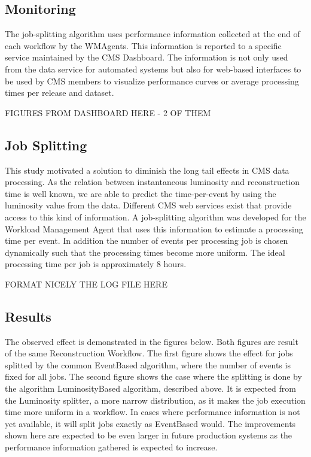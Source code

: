 \documentclass[a4paper]{jpconf}
\begin{document}
\subsection{Monitoring}

The job-splitting algorithm uses performance information collected at the 
end of each workflow by the WMAgents. This information is reported to a 
specific service maintained by the CMS Dashboard. The information is 
not only used from the data service for automated systems but also for 
web-based interfaces to be used by CMS members to visualize 
performance curves or average processing times per release and 
dataset. 

FIGURES FROM DASHBOARD HERE - 2 OF THEM

\subsection{Job Splitting}

This study motivated a solution to diminish the long tail effects in CMS 
data processing. As the relation between instantaneous luminosity and 
reconstruction time is well known, we are able to predict the 
time-per-event by using the luminosity value from the data. Different 
CMS web services exist that provide access to this kind of information. 
A job-splitting algorithm was developed for the Workload Management 
Agent that uses this information to estimate a processing time per 
event. In addition the number of events per processing job is chosen 
dynamically such that the processing times become more uniform. The 
ideal processing time per job is approximately 8 hours.


FORMAT NICELY THE LOG FILE HERE

\subsection{Results}

The observed effect is demonstrated in the figures below. Both figures are 
result of the same Reconstruction Workflow. The first figure shows the effect 
for jobs splitted by the common EventBased algorithm, where the number of 
events is fixed for all jobs. The second figure shows the case where the 
splitting is done by the algorithm LuminosityBased algorithm, described 
above. It is expected from the Luminosity splitter, a more narrow distribution, 
as it makes the job execution time more uniform in a workflow. In cases 
where performance information is not yet available, it will split jobs exactly as 
EventBased would. The improvements shown here are expected to be even 
larger in future production systems as the performance information gathered 
is expected to increase.
\end{document}
